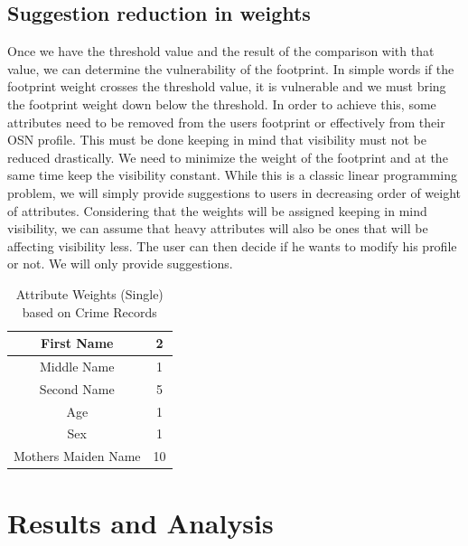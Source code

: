 \documentclass[10pt,conference]{IEEEtran}
\begin{document}
\subsection{Suggestion reduction in weights}
Once we have the threshold value and the result of the comparison with that value, we can determine the vulnerability of the footprint. In simple words if the footprint weight crosses the threshold value, it is vulnerable and we must bring the footprint weight down below the threshold. In order to achieve this, some attributes need to be removed from the users footprint or effectively from their OSN profile. This must be done keeping in mind that visibility must not be reduced drastically. We need to minimize the weight of the footprint and at the same time keep the visibility constant. While this is a classic linear programming problem, we will simply provide suggestions to users in decreasing order of weight of attributes. Considering that the weights will be assigned keeping in mind visibility, we can assume that heavy attributes will also be ones that will be affecting visibility less. The user can then decide if he wants to modify his profile or not. We will only provide suggestions.

\begin{table}[!t]
\renewcommand{\arraystretch}{3.0}
\caption{Attribute Weights (Single) based on Crime Records}
\label{attribute_table}
\centering
\begin{tabular}{|c||c|}
\hline
\large{First Name} & \large{2}\\
\hline
\large{Middle Name} & \large{1}\\
\hline
\large{Second Name} & \large{5}\\
\hline
\large{Age} & \large{1}\\
\hline
\large{Sex} & \large{1}\\
\hline
\large{Mothers Maiden Name} & \large{10}\\
\hline

\end{tabular}
\end{table}

\section{Results and Analysis}
\end{document}
